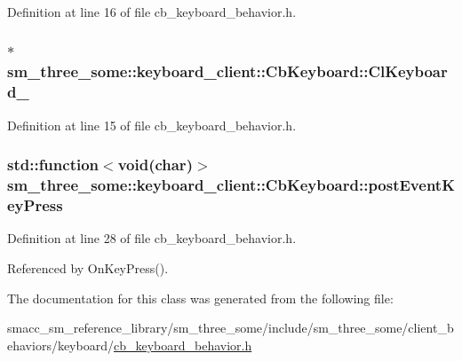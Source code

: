Definition at line 16 of file cb\+\_\+keyboard\+\_\+behavior.\+h.

\subsubsection[{\texorpdfstring{Cl\+Keyboard\+\_\+}{ClKeyboard_}}]{$\ast$ sm\+\_\+three\+\_\+some\+::keyboard\+\_\+client\+::\+Cb\+Keyboard\+::\+Cl\+Keyboard\+\_\+}\hypertarget{classsm__three__some_1_1keyboard__client_1_1CbKeyboard_a5b1cd75d7648a79294232faf88861064}{}\label{classsm__three__some_1_1keyboard__client_1_1CbKeyboard_a5b1cd75d7648a79294232faf88861064}


Definition at line 15 of file cb\+\_\+keyboard\+\_\+behavior.\+h.

\subsubsection[{\texorpdfstring{post\+Event\+Key\+Press}{postEventKeyPress}}]{\setlength{\rightskip}{0pt plus 5cm}std\+::function$<$void(char)$>$ sm\+\_\+three\+\_\+some\+::keyboard\+\_\+client\+::\+Cb\+Keyboard\+::post\+Event\+Key\+Press}\hypertarget{classsm__three__some_1_1keyboard__client_1_1CbKeyboard_af6666ca56b24512b936cea525c18f0fc}{}\label{classsm__three__some_1_1keyboard__client_1_1CbKeyboard_af6666ca56b24512b936cea525c18f0fc}


Definition at line 28 of file cb\+\_\+keyboard\+\_\+behavior.\+h.



Referenced by On\+Key\+Press().



The documentation for this class was generated from the following file\+:\begin{DoxyCompactItemize}
\item 
smacc\+\_\+sm\+\_\+reference\+\_\+library/sm\+\_\+three\+\_\+some/include/sm\+\_\+three\+\_\+some/client\+\_\+behaviors/keyboard/\hyperlink{cb__keyboard__behavior_8h}{cb\+\_\+keyboard\+\_\+behavior.\+h}\end{DoxyCompactItemize}
